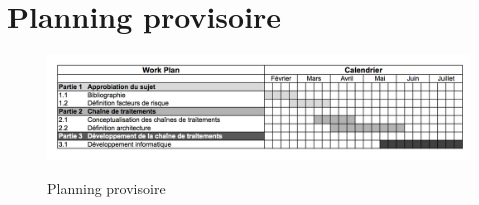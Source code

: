 \section*{Planning provisoire}


\begin{center}
\begin{figure}[h] \centering
\includegraphics[width=14cm]{GanttProvisoire}\\
\caption{\label{GanttProvisoire} Planning provisoire}
\end{figure}
\end{center}
